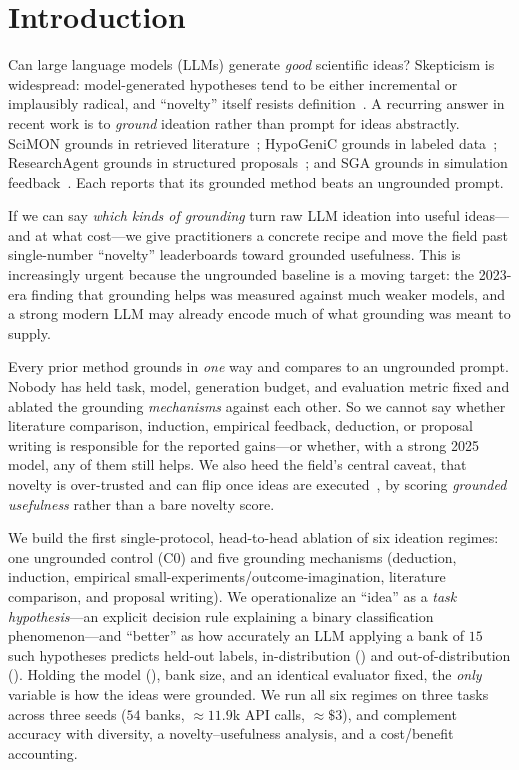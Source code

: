\section{Introduction}
\label{sec:intro}

Can large language models (LLMs) generate \emph{good} scientific ideas? Skepticism
is widespread: model-generated hypotheses tend to be either incremental or
implausibly radical, and ``novelty'' itself resists definition~\citep{si2024llm}.
A recurring answer in recent work is to \emph{ground} ideation rather than prompt
for ideas abstractly. SciMON grounds in retrieved literature~\citep{wang2023scimon};
HypoGeniC grounds in labeled data~\citep{zhou2024hypogenic}; ResearchAgent grounds
in structured proposals~\citep{baek2024researchagent}; and SGA grounds in simulation
feedback~\citep{ma2024sga}. Each reports that its grounded method beats an
ungrounded prompt.

 If we can say \emph{which kinds of grounding} turn raw LLM
ideation into useful ideas---and at what cost---we give practitioners a concrete
recipe and move the field past single-number ``novelty'' leaderboards toward
grounded usefulness. This is increasingly urgent because the ungrounded baseline is
a moving target: the 2023-era finding that grounding helps was measured against much
weaker models, and a strong modern LLM may already encode much of what grounding was
meant to supply.

 Every prior method grounds in \emph{one} way and compares to an
ungrounded prompt. Nobody has held task, model, generation budget, and evaluation
metric fixed and ablated the grounding \emph{mechanisms} against each other. So we
cannot say whether literature comparison, induction, empirical feedback, deduction,
or proposal writing is responsible for the reported gains---or whether, with a strong
2025 model, any of them still helps. We also heed the field's central caveat, that
novelty is over-trusted and can flip once ideas are executed~\citep{si2024llm}, by
scoring \emph{grounded usefulness} rather than a bare novelty score.

 We build the first single-protocol, head-to-head ablation of
six ideation regimes: one ungrounded control (C0) and five grounding mechanisms
(deduction, induction, empirical small-experiments/outcome-imagination, literature
comparison, and proposal writing). We operationalize an ``idea'' as a \emph{task
hypothesis}---an explicit decision rule explaining a binary classification
phenomenon---and ``better'' as how accurately an LLM applying a bank of $15$ such
hypotheses predicts held-out labels, in-distribution (\IND) and out-of-distribution
(\OOD). Holding the model (\gptmini), bank size, and an identical evaluator fixed,
the \emph{only} variable is how the ideas were grounded. We run all six regimes on
three \hypogenic{} tasks across three seeds ($54$ banks, $\approx 11.9$k API calls,
$\approx\$3$), and complement accuracy with diversity, a novelty--usefulness
analysis, and a cost/benefit accounting.

